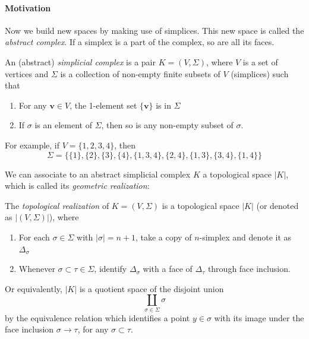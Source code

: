 \paragraph{Motivation}
Now we build new spaces by making use of simplices.
This new space is called the \emph{abstract complex}.
If a simplex is a part of the complex, so are all its faces.

\begin{definition}
An (abstract) \emph{simplicial complex} is a pair $K=(V,\Sigma)$,
where $V$ is a set of vertices and $\Sigma$ is a collection of non-empty finite subsets of $V$ (simplices) such that
\begin{enumerate}
\item
For any $\bm v\in V$, the 1-element set $\{\bm v\}$ is in $\Sigma$
\item
If $\sigma$ is an element of $\Sigma$, then so is any non-empty subset of $\sigma$.
\end{enumerate}
\end{definition}
For example, if $V=\{1,2,3,4\}$, then
\[
\Sigma=\{\{1\},\{2\},\{3\},\{4\},\{1,3,4\},\{2,4\},\{1,3\},\{3,4\},\{1,4\}\}
\]

We can associate to an abstract simplicial complex $K$ a topological space $|K|$, which is called its \emph{geometric realization}:
\begin{definition}
The \emph{topological realization} of $K=(V,\Sigma)$ is 
a topological space $|K|$ (or denoted as $|(V,\Sigma)|$), where
\begin{enumerate}
\item
For each $\sigma\in\Sigma$ with $|\sigma|=n+1$, 
take a copy of $n$-simplex and denote it as $\Delta_\sigma$
\item
Whenever $\sigma\subset\tau\in\Sigma$, identify $\Delta_{\sigma}$ with a face of $\Delta_{\tau}$ through face inclusion.
\end{enumerate}
\end{definition}
\begin{remark}
Or equivalently, $|K|$ is a quotient space of the disjoint union
\[
\coprod _{\sigma\in\Sigma}\sigma
\]
by the equivalence relation which identifies a point $y\in\sigma$ with its image under the face inclusion $\sigma\to\tau$, for any $\sigma\subset\tau$.
\end{remark}




